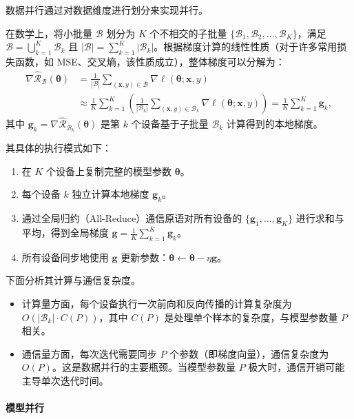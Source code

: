 数据并行通过对数据维度进行划分来实现并行。

在数学上，将小批量 $\mathcal{B}$ 划分为 $K$ 个不相交的子批量 $\{\mathcal{B}_1, \mathcal{B}_2, \dots, \mathcal{B}_K\}$，满足 $\mathcal{B} = \bigcup_{k=1}^K \mathcal{B}_k$ 且 $|\mathcal{B}| = \sum_{k=1}^K |\mathcal{B}_k|$。根据梯度计算的线性性质（对于许多常用损失函数，如 MSE、交叉熵，该性质成立），整体梯度可以分解为：
\begin{equation}
    \begin{aligned}
        \nabla \hat{\mathcal{R}}_{\mathcal{B}}(\bm{\theta})
         & = \frac{1}{|\mathcal{B}|} \sum_{(\bm{x}, y) \in \mathcal{B}} \nabla \ell(\bm{\theta}; \bm{x}, y)                                                   \\
         & \approx \frac{1}{K} \sum_{k=1}^K \left( \frac{1}{|\mathcal{B}_k|} \sum_{(\bm{x}, y) \in \mathcal{B}_k} \nabla \ell(\bm{\theta}; \bm{x}, y) \right)
        = \frac{1}{K} \sum_{k=1}^K \bm{g}_k,
    \end{aligned}
\end{equation}
其中 $\bm{g}_k = \nabla \hat{\mathcal{R}}_{\mathcal{B}_k}(\bm{\theta})$ 是第 $k$ 个设备基于子批量 $\mathcal{B}_k$ 计算得到的本地梯度。

其具体的执行模式如下：
\begin{enumerate}
    \item 在 $K$ 个设备上复制完整的模型参数 $\bm{\theta}$。
    \item 每个设备 $k$ 独立计算本地梯度 $\bm{g}_k$。
    \item 通过全局归约（All-Reduce）通信原语对所有设备的 $\{\bm{g}_1, \dots, \bm{g}_K\}$ 进行求和与平均，得到全局梯度 $\bm{g} = \frac{1}{K} \sum_{k=1}^K \bm{g}_k$。
    \item 所有设备同步地使用 $\bm{g}$ 更新参数：$\bm{\theta} \leftarrow \bm{\theta} - \eta \bm{g}$。
\end{enumerate}

下面分析其计算与通信复杂度。
\begin{itemize}
    \item 计算量方面，每个设备执行一次前向和反向传播的计算复杂度为 $O(|\mathcal{B}_k| \cdot C(P))$，其中 $C(P)$ 是处理单个样本的复杂度，与模型参数量 $P$ 相关。
    \item 通信量方面，每次迭代需要同步 $P$ 个参数（即梯度向量），通信复杂度为 $O(P)$。这是数据并行的主要瓶颈。当模型参数量 $P$ 极大时，通信开销可能主导单次迭代时间。
\end{itemize}

\paragraph{模型并行}

